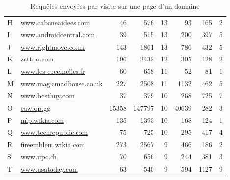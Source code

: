 \begin{table}[]
\begin{tabular}{llrrrrrr}
H & \scriptsize \url{www.cabaneaidees.com}       & 46                    & 576           & 13                   & 93                       & 165          & 2              \\
I & \scriptsize \url{www.androidcentral.com}     & 39                    & 515           & 13                   & 200                      & 397          & 5              \\
J & \scriptsize \url{www.rightmove.co.uk}        & 143                   & 1861          & 13                   & 786                      & 432          & 5              \\
K & \scriptsize \url{zattoo.com}                 & 196                   & 2432          & 12                   & 305                      & 128          & 2              \\
L & \scriptsize \url{www.les-coccinelles.fr}     & 60                    & 658           & 11                   & 52                       & 81           & 1              \\
M & \scriptsize \url{www.magicmadhouse.co.uk}    & 227                   & 2508          & 11                   & 1132                     & 462          & 5              \\
N & \scriptsize \url{www.bestbuy.com}            & 37                    & 379           & 10                   & 268                      & 725          & 7              \\
O & \scriptsize \url{euw.op.gg}                  & 15358                 & 147797        & 10                   & 40639                    & 282          & 3              \\
P & \scriptsize \url{mlp.wikia.com}              & 135                   & 1393          & 10                   & 168                      & 124          & 1              \\
Q & \scriptsize \url{www.techrepublic.com}       & 75                    & 725           & 10                   & 295                      & 417          & 4              \\
R & \scriptsize \url{fireemblem.wikia.com}       & 273                   & 2567          & 9                    & 466                      & 186          & 2              \\
S & \scriptsize \url{www.upc.ch}                 & 70                    & 656           & 9                    & 244                      & 381          & 3              \\
T & \scriptsize \url{www.usatoday.com}           & 63                    & 540           & 9                    & 594                      & 1127         & 9              \\       
\end{tabular}
\caption{Requêtes envoyées par visite sur une page d'un domaine}
\label{trackers-2}
\end{table}

